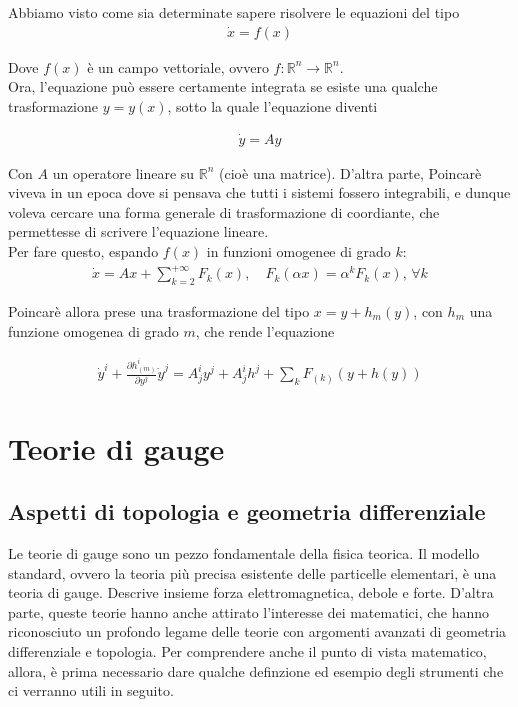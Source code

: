 \documentclass{report}
\begin{document}
Abbiamo visto come sia determinate sapere risolvere le equazioni del tipo 
\begin{align}
    \dot{x} = f(x)
\end{align}

Dove \(f(x)\) è un campo vettoriale, ovvero \(f: \mathbb{R}^n \rightarrow \mathbb{R}^n\). \\

Ora, l'equazione può essere certamente integrata se esiste una qualche trasformazione \(y = y(x)\), sotto la quale l'equazione diventi 

\begin{align}
    \dot{y} = A y
\end{align}

Con \(A\) un operatore lineare su \(\mathbb{R}^n\) (cioè una matrice). D'altra parte, Poincarè viveva in un epoca dove si pensava che tutti i sistemi fossero integrabili, e dunque voleva cercare una forma generale di trasformazione di coordiante, che permettesse di scrivere l'equazione  lineare. \\

Per fare questo, espando \(f(x)\) in funzioni omogenee di grado \(k\): 
\begin{align}
    \dot{x} = A x + \sum_{k=2}^{+\infty} F_k(x), \quad F_k(\alpha x) = \alpha^k F_k(x), \, \forall k
\end{align}

Poincarè allora prese una trasformazione del tipo \(x = y + h_m(y)\), con \(h_m\) una funzione omogenea di grado \(m\), che rende l'equazione

\begin{align}
    \dot{y}^i + \frac{\partial h^i_{(m)}}{\partial y^j}\dot{y}^j = A^i_j y^j + A^i_j h^j + \sum_k F_{(k)}(y + h(y))
\end{align}


\chapter{Teorie di gauge}

\section{Aspetti di topologia e geometria differenziale}

Le teorie di gauge sono un pezzo fondamentale della fisica teorica. Il modello standard, ovvero la teoria più precisa esistente delle particelle elementari, è una teoria di gauge. Descrive insieme forza elettromagnetica, debole e forte. D'altra parte, queste teorie hanno anche attirato l'interesse dei matematici, che hanno riconosciuto un profondo legame delle teorie con argomenti avanzati di geometria differenziale e topologia. Per comprendere anche il punto di vista matematico, allora, è prima necessario dare qualche definzione ed esempio degli strumenti che ci verranno utili in seguito. \\
\end{document}
